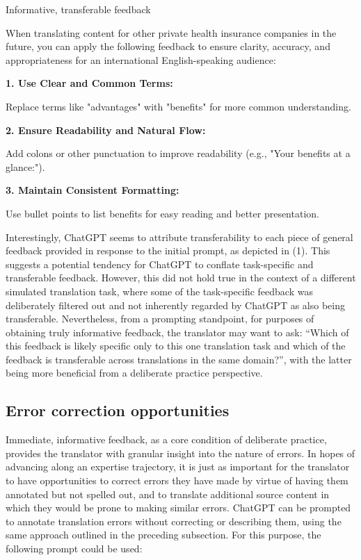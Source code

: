 \documentclass[output=paper]{langscibook}
\begin{document}
\ea\label{extab:2:4}
Informative, transferable feedback

\ttfamily\raggedright
When translating content for other private health insurance companies in the future, you can apply the following feedback to ensure clarity, accuracy, and appropriateness for an international English-speaking audience:

\textbf{1. Use Clear and Common Terms:}

Replace terms like "advantages" with "benefits" for more common understanding.

\textbf{2. Ensure Readability and Natural Flow:}

Add colons or other punctuation to improve readability (e.g., "Your benefits at a glance:").

\textbf{3. Maintain Consistent Formatting:}

Use bullet points to list benefits for easy reading and better presentation.
\z

Interestingly, ChatGPT seems to attribute transferability to each piece of general feedback provided in response to the initial prompt, as depicted in (1). This suggests a potential tendency for ChatGPT to conflate task-specific and transferable feedback. However, this did not hold true in the context of a different simulated translation task, where some of the task-specific feedback was deliberately filtered out and not inherently regarded by ChatGPT as also being transferable. Nevertheless, from a prompting standpoint, for purposes of obtaining truly informative feedback, the translator may want to ask: “Which of this feedback is likely specific only to this one translation task and which of the feedback is transferable across translations in the same domain?”, with the latter being more beneficial from a deliberate practice perspective.

\subsection{Error correction opportunities}

Immediate, informative feedback, as a core condition of deliberate practice, provides the translator with granular insight into the nature of errors. In hopes of advancing along an expertise trajectory, it is just as important for the translator to have opportunities to correct errors they have made by virtue of having them annotated but not spelled out, and to translate additional source content in which they would be prone to making similar errors. ChatGPT can be prompted to annotate translation errors without correcting or describing them, using the same approach outlined in the preceding subsection. For this purpose, the following prompt could be used:
\end{document}
